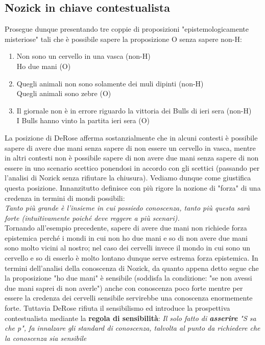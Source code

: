 \documentclass[10pt,a4paper]{article}
\begin{document}
\subsection{Nozick in chiave contestualista}
Prosegue dunque presentando tre coppie di proposizioni "epistemologicamente misteriose" tali che è possibile sapere la proposizione O senza sapere non-H:
\begin{enumerate}
	\item Non sono un cervello in una vasca (non-H) \\ Ho due mani (O)
	\item Quegli animali non sono solamente dei muli dipinti (non-H) \\ Quegli animali sono zebre (O)
	\item  Il giornale non è in errore riguardo la vittoria dei Bulls di ieri sera (non-H)\\ I Bulls hanno vinto la partita ieri sera (O)
\end{enumerate}
La posizione di DeRose afferma sostanzialmente che in alcuni contesti è possibile sapere di avere due mani senza sapere di non essere un cervello in vasca, mentre in altri contesti non è possibile sapere di non avere due mani senza sapere di non essere in uno scenario scettico ponendosi in accordo con gli scettici (passando per l'analisi di Nozick senza rifiutare la chiusura). Vediamo dunque come giustifica questa posizione. Innanzitutto definisce con più rigore la nozione di "forza" di una credenza in termini di mondi possibili:\\
\textit{Tanto più grande è l'insieme in cui possiedo conoscenza, tanto più questa sarà forte (intuitivamente poiché deve reggere a più scenari).} \\
Tornando all'esempio precedente, sapere di avere due mani non richiede forza epistemica perché i mondi in cui non ho due mani e so di non avere due mani sono molto vicini al nostro; nel caso dei cervelli invece il mondo in cui sono un cervello e so di esserlo è molto lontano dunque serve estrema forza epistemica. In termini dell'analisi della conoscenza di Nozick, da quanto appena detto segue che la proposizione "ho due mani" è sensibile (soddisfa la condizione: "se non avessi due mani saprei di non averle") anche con conoscenza poco forte mentre per essere la credenza dei cervelli sensibile servirebbe una conoscenza enormemente forte. Tuttavia DeRose rifiuta il sensibilismo ed introduce la prospettiva contestualista mediante la \textbf{regola di sensibilità}:
\textit{Il solo fatto di \textbf{asserire} "S sa che p", fa innalzare gli standard di conoscenza, talvolta al punto da richiedere che la conoscenza sia sensibile}\\
\end{document}
